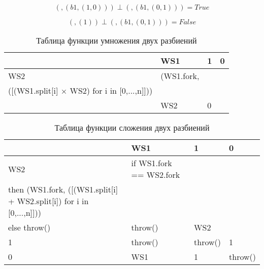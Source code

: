 \documentclass[a4paper,14pt]{article}
\begin{document}
\begin{equation}
	(, (b1, (1,0))) \perp (, (b1, (0,1))) = True
	\nonumber
\end{equation}

\begin{equation}
	(, (1)) \perp (, (b1, (0,1))) = False 
	\nonumber
\end{equation}



\begin{table}
    \begin{tabular}{|l|>{\centering}m{8cm} |l|l|}
    \hline
    ~   & WS1                                                                              & 1       & 0       \\ \hline
    WS2 & (WS1.fork,\\
    ([(WS1.split[i] $\times$ WS2) for i in [0,...,n]]))\\
      & WS2  & 0    \\ \hline
    \end{tabular}
\caption{Таблица функции умножения двух разбиений}\label{tab:mult}
\end{table}



\begin{table}
    \begin{tabular}{|l|>{\centering}m{8cm} |l|l|}
    \hline
    ~   & WS1                                                                              & 1       & 0       \\ \hline
    WS2 & if WS1.fork == WS2.fork \\
    then (WS1.fork, ([(WS1.split[i] + WS2.split[i]) for i in [0,...,n]]))\\
     else throw() & throw() & WS2     \\ \hline
    1   & throw()                                                                          & throw() & 1       \\ \hline
    0   & WS1                                                                              & 1       & throw() \\ \hline
    \end{tabular}
\caption{Таблица функции сложения двух разбиений}\label{tab:sum}
\end{table}
\end{document}
